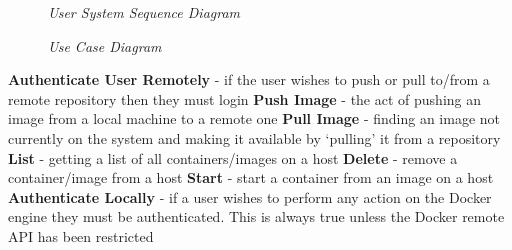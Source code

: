 \begin{figure}[!ht]
\centering
{}
\caption{\em User System Sequence Diagram}
\label{fig:user-sequence-diagram}
\end{figure}

\begin{figure}[!ht]
\centering
{}
\caption{\em Use Case Diagram}
\end{figure}

\textbf{Authenticate User Remotely} - if the user wishes to push or pull to/from a remote repository then they must login\newline
\textbf{Push Image} - the act of pushing an image from a local machine to a remote one\newline
\textbf{Pull Image} - finding an image not currently on the system and making it available by `pulling' it from a repository\newline
\textbf{List} - getting a list of all containers/images on a host\newline
\textbf{Delete} - remove a container/image from a host\newline
\textbf{Start} - start a container from an image on a host\newline
\textbf{Authenticate Locally} - if a user wishes to perform any action on the Docker engine they must be authenticated. This is always true unless the Docker remote API has been restricted\newline


